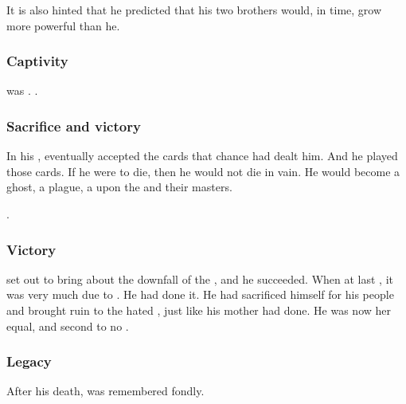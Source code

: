 It is also hinted that he predicted that his two brothers would, in time, grow more powerful than he. 





\subsubsection{Captivity}
\Nexagglachel{} was . 
. 





\subsubsection{Sacrifice and victory}
In his , \Nexagglachel{} eventually accepted the cards that chance had dealt him. 
And he played those cards. 
If he were to die, then he would not die in vain. 
He would become a ghost, a plague, a  upon the \resphain{} and their \bane{} masters. 

\Nexagglachel {}. 





\subsubsection{Victory}
\Nexagglachel set out to bring about the downfall of the \resphain, and he succeeded. 
When at last , it was very much due to \NexagglachelsCurse. 
He had done it. 
He had sacrificed himself for his people and brought ruin to the hated \banes, just like his mother had done. 
He was now her equal, and second to no \dragon. 





\subsubsection{Legacy}
After his death, \Nexagglachel{} was remembered fondly.


